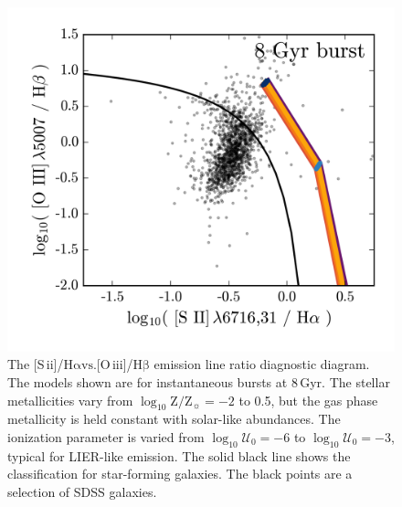 \documentclass[preprint2]{aastex62}
\newcommand\vs{\ensuremath{\mathrm{vs.}}\xspace}
\newcommand{\sii}{[S\,{\sc ii}]\xspace}
\newcommand{\oiii}{[O\,{\sc iii}]\xspace}
\newcommand{\ha}{\ensuremath{\mathrm{H\alpha}}\xspace}
\newcommand{\hb}{\ensuremath{\mathrm{H\beta}}\xspace}
\newcommand{\logten}{\ensuremath{\log_{10}}}
\newcommand{\logZeq}[1]{\ensuremath{\logten \mathrm{Z}/\mathrm{Z}_{\sun} = #1}}
\newcommand{\logUeq}[1]{\ensuremath{\logten \mathcal{U}_0 = #1}}
\newcommand{\Gyr}{$\,$Gyr\xspace}
\begin{document}
\begin{figure}
  \begin{center}
    \includegraphics[width=\linewidth]{figs/f7.png}
    \caption{The \sii/\ha \vs \oiii/\hb emission line ratio diagnostic diagram. The models shown are for instantaneous bursts at 8\Gyr. The stellar metallicities vary from \logZeq{-2} to 0.5, but the gas phase metallicity is held constant with solar-like abundances. The ionization parameter is varied from \logUeq{-6} to \logUeq{-3}, typical for LIER-like emission. The solid black line shows the \citet{Kewley+2006} classification for star-forming galaxies. The black points are a selection of SDSS galaxies.}
    \label{fig:BPT2}
  \end{center}
\end{figure}
\end{document}
